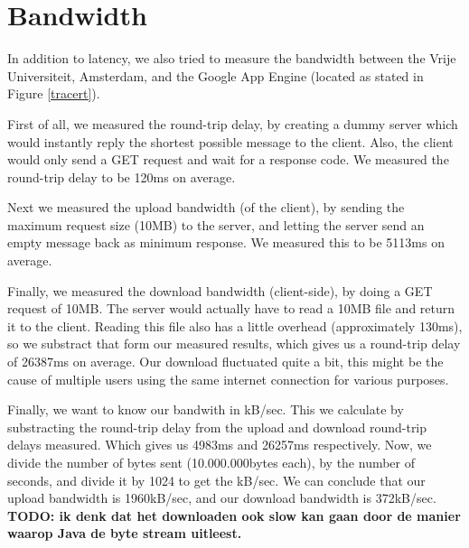 
\section{Bandwidth}
In addition to latency, we also tried to measure the bandwidth between the
Vrije Universiteit, Amsterdam, and the Google App Engine (located as stated in
Figure \ref{tracert}).

First of all, we measured the round-trip delay, by creating a dummy server
which would instantly reply the shortest possible message to the client. Also,
the client would only send a GET request and wait for a response code. We
measured the round-trip delay to be 120ms on average.

Next we measured the upload bandwidth (of the client), by sending the maximum
request size (10MB) to the server, and letting the server send an empty message
back as minimum response. We measured this to be 5113ms on average. 

Finally, we measured the download bandwidth (client-side), by doing a GET
request of 10MB. The server would actually have to read a 10MB file and return
it to the client. Reading this file also has a little overhead (approximately
130ms), so we substract that form our measured results, which gives us a
round-trip delay of 26387ms on average. Our download fluctuated quite a bit,
this might be the cause of multiple users using the same internet connection
for various purposes.

Finally, we want to know our bandwith in kB/sec. This we calculate by
substracting the round-trip delay from the upload and download round-trip
delays measured. Which gives us 4983ms and 26257ms respectively. Now, we divide
the number of bytes sent (10.000.000bytes each), by the number of seconds, and
divide it by 1024 to get the kB/sec. We can conclude that our upload bandwidth
is 1960kB/sec, and our download bandwidth is 372kB/sec. \textbf{TODO: ik denk
dat het downloaden ook slow kan gaan door de manier waarop Java de byte stream
uitleest.}



